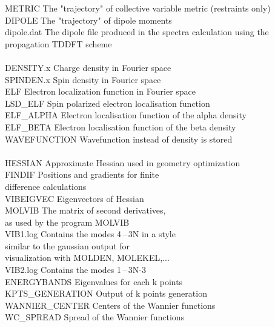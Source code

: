 \documentclass[twoside,10pt,titlepage,a4paper]{article}
\begin{document}
\begin{tabbing}
METRIC          \> The "trajectory" of collective variable metric (restraints only) \\
DIPOLE          \> The "trajectory" of dipole moments    \\
dipole.dat      \> The dipole file produced in the spectra calculation using the propagation TDDFT scheme \\
\\
DENSITY.x       \> Charge density in Fourier space       \\
SPINDEN.x       \> Spin density in Fourier space         \\
ELF             \> Electron localization function in Fourier space \\
LSD\_ELF        \> Spin polarized electron localisation function \\
ELF\_ALPHA      \> Electron localisation function of the alpha density \\
ELF\_BETA       \> Electron localisation function of the beta density \\
WAVEFUNCTION    \> Wavefunction instead of density is stored \\
\\
HESSIAN         \> Approximate Hessian used in geometry optimization \\
FINDIF          \> Positions and gradients for finite    \\
                \> difference calculations               \\
VIBEIGVEC       \> Eigenvectors of Hessian               \\
MOLVIB          \> The matrix of second derivatives,     \\
                \> as used by the program MOLVIB         \\
VIB1.log        \> Contains the modes 4\,--\,3N in a style\\
                \> similar to the gaussian output for    \\
                \> visualization with MOLDEN, MOLEKEL,...\\
VIB2.log        \> Contains the modes 1\,--\,3N-3        \\
ENERGYBANDS     \> Eigenvalues for each k points         \\
KPTS\_GENERATION\> Output of k points generation         \\
WANNIER\_CENTER \> Centers of the Wannier functions      \\
WC\_SPREAD      \> Spread of the Wannier functions      \\

\end{tabbing}
\end{document}
